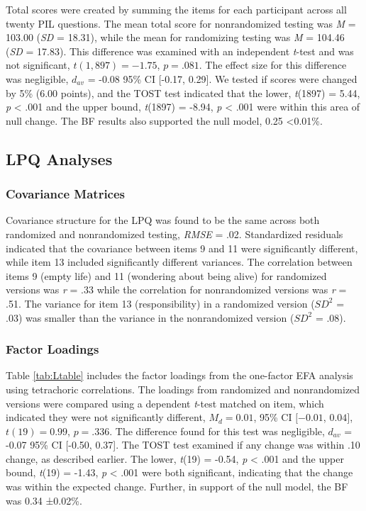 \documentclass[english,man, mask]{apa6}
\theoremstyle{definition}
\theoremstyle{definition}
\theoremstyle{definition}
\theoremstyle{remark}
\begin{document}
Total scores were created by summing the items for each participant
across all twenty PIL questions. The mean total score for nonrandomized
testing was \emph{M} = 103.00 (\emph{SD} = 18.31), while the mean for
randomizing testing was \emph{M} = 104.46 (\emph{SD} = 17.83). This
difference was examined with an independent \emph{t}-test and was not
significant, \(t(1,897) = -1.75\), \(p = .081\). The effect size for
this difference was negligible, \(d_{av}\) = -0.08 95\% CI {[}-0.17,
0.29{]}. We tested if scores were changed by 5\% (6.00 points), and the
TOST test indicated that the lower, \emph{t}(1897) = 5.44, \emph{p}
\textless{} .001 and the upper bound, \emph{t}(1897) = -8.94, \emph{p}
\textless{} .001 were within this area of null change. The BF results
also supported the null model, 0.25 \textless{}0.01\%.

\subsection{LPQ Analyses}\label{lpq-analyses}

\subsubsection{Covariance Matrices}\label{covariance-matrices-1}

Covariance structure for the LPQ was found to be the same across both
randomized and nonrandomized testing, \emph{RMSE} = .02. Standardized
residuals indicated that the covariance between items 9 and 11 were
significantly different, while item 13 included significantly different
variances. The correlation between items 9 (empty life) and 11
(wondering about being alive) for randomized versions was \emph{r} = .33
while the correlation for nonrandomized versions was \emph{r} = .51. The
variance for item 13 (responsibility) in a randomized version (\(SD^2\)
= .03) was smaller than the variance in the nonrandomized version
(\(SD^2\) = .08).

\subsubsection{Factor Loadings}\label{factor-loadings-1}

Table \ref{tab:Ltable} includes the factor loadings from the one-factor
EFA analysis using tetrachoric correlations. The loadings from
randomized and nonrandomized versions were compared using a dependent
\emph{t}-test matched on item, which indicated they were not
significantly different, \(M_d = 0.01\), 95\% CI \([-0.01\), \(0.04]\),
\(t(19) = 0.99\), \(p = .336\). The difference found for this test was
negligible, \(d_{av}\) = -0.07 95\% CI {[}-0.50, 0.37{]}. The TOST test
examined if any change was within .10 change, as described earlier. The
lower, \emph{t}(19) = -0.54, \emph{p} \textless{} .001 and the upper
bound, \emph{t}(19) = -1.43, \emph{p} \textless{} .001 were both
significant, indicating that the change was within the expected change.
Further, in support of the null model, the BF was 0.34 ±0.02\%.
\end{document}
